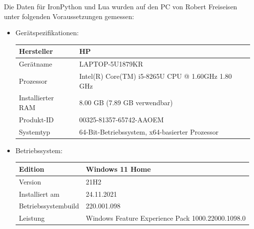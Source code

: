 Die Daten für IronPython und Lua wurden auf den PC von Robert Freiseisen unter folgenden Voraussetzungen  gemessen:
\begin{itemize}
    \item Gerätspezifikationen:
    \begin{table}[H]
        \center
        \begin{tabular}{|p{3cm}|p{4cm}|}
            \hline
            Hersteller & HP \\ \hline
            Gerätname & LAPTOP-5U1879KR \\ \hline
            Prozessor & Intel(R) Core(TM) i5-8265U CPU @ 1.60GHz   1.80 GHz \\ \hline
            Installierter RAM & 8.00 GB (7.89 GB verwendbar) \\ \hline
            Produkt-ID & 00325-81357-65742-AAOEM \\ \hline
            Systemtyp & 64-Bit-Betriebssystem, x64-basierter Prozessor \\ \hline
        \end{tabular}
    \end{table}
    \item Betriebssystem:
    \begin{table}[H]
        \center
        \begin{tabular}{|p{4cm}|p{4cm}|}
            \hline
            Edition & Windows 11 Home \\ \hline
            Version & 21H2 \\ \hline
            Installiert am & 24.11.2021 \\ \hline
            Betriebssystembuild & 220.001.098 \\ \hline
            Leistung & Windows Feature Experience Pack 1000.22000.1098.0 \\ \hline
        \end{tabular}        
    \end{table}
\end{itemize}

